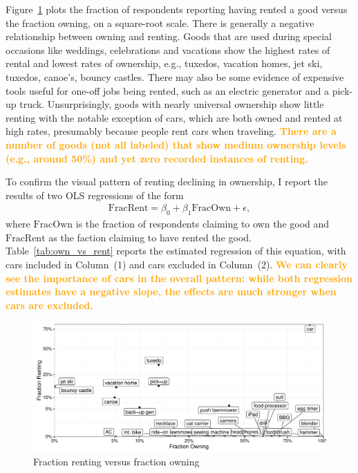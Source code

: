 \documentclass[11pt]{article}
\newcommand{\important}[1]{\textcolor{orange}{\textbf{#1}}}
\newcommand{\important}[1]{#1}
\begin{document}
Figure~\ref{fig:scatter} plots the fraction of respondents reporting having rented a good versus the fraction owning, on a square-root scale.  
There is generally a negative relationship between owning and renting. 
Goods that are used during special occasions like weddings, celebrations and vacations show the highest rates of rental and lowest rates of ownership, e.g., tuxedos, vacation homes, jet ski, tuxedos, canoe's, bouncy castles. 
There may also be some evidence of expensive tools useful for one-off jobs being rented, such as an electric generator and a pick-up truck. 
Unsurprisingly, goods with nearly universal ownership show little renting with the notable exception of cars, which are both owned and rented at high rates, presumably because people rent cars when traveling.  
\important{There are a number of goods (not all labeled) that show medium ownership levels (e.g., around 50\%) and yet zero recorded instances of renting.} 

To confirm the visual pattern of renting declining in ownership, I report the results of two OLS regressions of the form
\begin{align}
\mbox{FracRent} = \beta_0 + \beta_1 \mbox{FracOwn} + \epsilon,  
\end{align} 
where $\mbox{FracOwn}$ is the fraction of respondents claiming to own the good and $\mbox{FracRent}$ as the faction claiming to have rented the good. 
Table~\ref{tab:own_vs_rent} reports the estimated regression of this equation, with cars included in Column~(1) and cars excluded in Column~(2). 
\important{We can clearly see the importance of cars in the overall pattern: while both regression estimates have a negative slope, the effects are much stronger when cars are excluded.}


\begin{figure}
\centering 
\caption{Fraction renting versus fraction owning \label{fig:scatter} }
\begin{minipage}{0.60 \linewidth}
\includegraphics[width = \linewidth]{./plots/scatter_rent_v_own.pdf} 
\end{minipage} 
\end{figure} 
\end{document}
